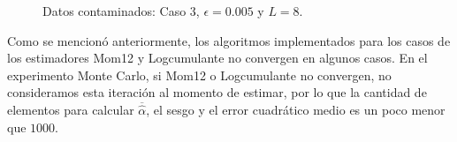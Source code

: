 \begin{figure}[h!]
	\caption{\label{Caso3L8}\small Datos contaminados: Caso $3$, $\epsilon=0.005$ y $ L=8$.}
\end{figure}

Como se mencionó anteriormente, los algoritmos implementados para los casos de los estimadores Mom12 y Logcumulante no convergen en algunos casos. En el experimento Monte Carlo, si Mom12 o  Logcumulante no convergen, no consideramos esta iteración al momento de estimar, por lo que la cantidad de elementos para calcular $\overline{\widehat{\alpha}}$, el sesgo y el error cuadrático medio es un poco menor que $1000$.


